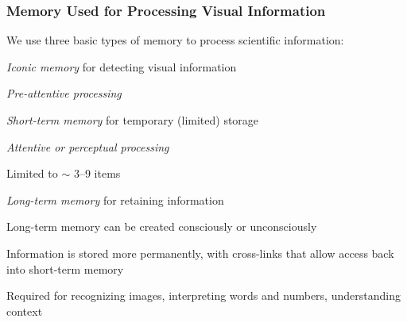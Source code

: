 \documentclass[10pt]{beamer}
\newcommand{\bi}{\begin{itemize}}
\newcommand{\ei}{\end{itemize}}
\begin{document}
\begin{frame}
\frametitle{Memory Used for Processing Visual Information}

{\small We use three basic types of memory to process
  scientific information:

      \bi
{\footnotesize
      \item {\color{blue} \em Iconic memory} for detecting visual information
            \bi
{\scriptsize
            \item {\em \color{magenta} Pre-attentive processing}\\
}
             \ei
 
     \item {\color{blue} \em Short-term memory} for temporary (limited)
        storage

            \bi
{\scriptsize
            \item {\color{magenta} \em Attentive or perceptual processing} 
            \item Limited to $\sim$ 3--9 items
}
            \ei

      \item {\color{blue} \em Long-term memory} for retaining information

            \bi
{\scriptsize
            \item Long-term memory can be created consciously or unconsciously
            
            \vspace{1ex}
            \item Information is stored more permanently, with cross-links
              that allow access back into short-term memory
            
            \vspace{1ex}
            \item Required for recognizing images, interpreting words and
              numbers, understanding context\\
}
            \ei
}
      \ei
}

\end{frame}
\end{document}
